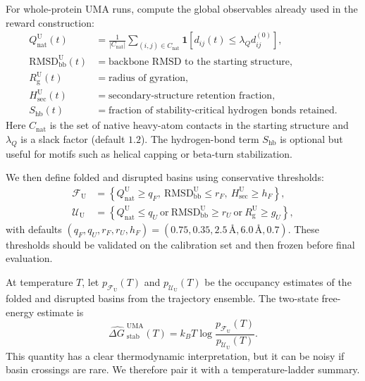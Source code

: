 \documentclass[11pt]{article}
\newcommand{\angstrom}{\ensuremath{\text{\AA}}}
\newcommand{\dG}{\ensuremath{\Delta G \ }}
\begin{document}
For whole-protein UMA runs, compute the global observables already used in the reward construction:
\begin{align}
    Q_{\mathrm{nat}}^{\mathrm U}(t) &= \frac{1}{|C_{\mathrm{nat}}|}\sum_{(i,j)\in C_{\mathrm{nat}}}\mathbf{1}\!\left[d_{ij}(t)\leq \lambda_Q d_{ij}^{(0)}\right],\\
    \mathrm{RMSD}_{\mathrm{bb}}^{\mathrm U}(t) &= \text{backbone RMSD to the starting structure},\\
    R_{\mathrm g}^{\mathrm U}(t) &= \text{radius of gyration},\\
    H_{\mathrm{sec}}^{\mathrm U}(t) &= \text{secondary-structure retention fraction},\\
    S_{\mathrm{hb}}(t) &= \text{fraction of stability-critical hydrogen bonds retained}.
\end{align}
Here $C_{\mathrm{nat}}$ is the set of native heavy-atom contacts in the starting structure and $\lambda_Q$ is a slack factor (default $1.2$). The hydrogen-bond term $S_{\mathrm{hb}}$ is optional but useful for motifs such as helical capping or beta-turn stabilization.

We then define folded and disrupted basins using conservative thresholds:
\begin{align}
    \mathcal{F}_{\mathrm U} &= \left\{Q_{\mathrm{nat}}^{\mathrm U}\geq q_F,\ \mathrm{RMSD}_{\mathrm{bb}}^{\mathrm U}\leq r_F,\ H_{\mathrm{sec}}^{\mathrm U}\geq h_F\right\},\\
    \mathcal{U}_{\mathrm U} &= \left\{Q_{\mathrm{nat}}^{\mathrm U}\leq q_U\ \text{or}\ \mathrm{RMSD}_{\mathrm{bb}}^{\mathrm U}\geq r_U\ \text{or}\ R_{\mathrm g}^{\mathrm U}\geq g_U\right\},
\end{align}
with defaults $(q_F,q_U,r_F,r_U,h_F)=(0.75,0.35,2.5\,\angstrom,6.0\,\angstrom,0.7)$. These thresholds should be validated on the calibration set and then frozen before final evaluation.

At temperature $T$, let $p_{\mathcal F_{\mathrm U}}(T)$ and $p_{\mathcal U_{\mathrm U}}(T)$ be the occupancy estimates of the folded and disrupted basins from the trajectory ensemble. The two-state free-energy estimate is
\begin{equation}
\label{eq:twostateg}
    \widehat{\dG}^{\mathrm{UMA}}_{\mathrm{stab}}(T)=k_B T \log\frac{p_{\mathcal{F}_{\mathrm U}}(T)}{p_{\mathcal{U}_{\mathrm U}}(T)}.
\end{equation}
This quantity has a clear thermodynamic interpretation, but it can be noisy if basin crossings are rare. We therefore pair it with a temperature-ladder summary.
\end{document}

